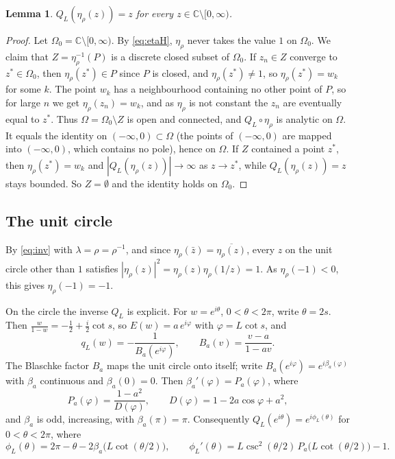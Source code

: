 \documentclass[11pt]{amsart}
\newtheorem{lemma}[theorem]{Lemma}
\theoremstyle{remark}
\newcommand{\C}{\mathbb C}
\begin{document}
\begin{lemma}\label{lem:branch}
$Q_L(\eta_\rho(z))=z$ for every $z\in\C\setminus[0,\infty)$.
\end{lemma}

\begin{proof}
Let $\Omega_0=\C\setminus[0,\infty)$. By \eqref{eq:etaH}, $\eta_\rho$ never takes the value $1$ on $\Omega_0$. We claim that $Z=\eta_\rho^{-1}(P)$ is a discrete closed subset of $\Omega_0$. If $z_n\in Z$ converge to $z^*\in\Omega_0$, then $\eta_\rho(z^*)\in P$ since $P$ is closed, and $\eta_\rho(z^*)\ne1$, so $\eta_\rho(z^*)=w_k$ for some $k$. The point $w_k$ has a neighbourhood containing no other point of $P$, so for large $n$ we get $\eta_\rho(z_n)=w_k$, and as $\eta_\rho$ is not constant the $z_n$ are eventually equal to $z^*$. Thus $\Omega=\Omega_0\setminus Z$ is open and connected, and $Q_L\circ\eta_\rho$ is analytic on $\Omega$. It equals the identity on $(-\infty,0)\subset\Omega$ (the points of $(-\infty,0)$ are mapped into $(-\infty,0)$, which contains no pole), hence on $\Omega$. If $Z$ contained a point $z^*$, then $\eta_\rho(z^*)=w_k$ and $|Q_L(\eta_\rho(z))|\to\infty$ as $z\to z^*$, while $Q_L(\eta_\rho(z))=z$ stays bounded. So $Z=\emptyset$ and the identity holds on $\Omega_0$.
\end{proof}

\subsection{The unit circle}
By \eqref{eq:inv} with $\lambda=\rho=\rho^{-1}$, and since $\eta_\rho(\bar z)=\overline{\eta_\rho(z)}$, every $z$ on the unit circle other than $1$ satisfies $|\eta_\rho(z)|^2=\eta_\rho(z)\eta_\rho(1/z)=1$. As $\eta_\rho(-1)<0$, this gives $\eta_\rho(-1)=-1$.

On the circle the inverse $Q_L$ is explicit. For $w=e^{i\theta}$, $0<\theta<2\pi$, write $\theta=2s$. Then $\frac{w}{1-w}=-\frac12+\frac i2\cot s$, so $E(w)=a\,e^{i\varphi}$ with $\varphi=L\cot s$, and
\[
q_L(w)=-\frac1{B_a(e^{i\varphi})},\qquad B_a(v)=\frac{v-a}{1-av}.
\]
The Blaschke factor $B_a$ maps the unit circle onto itself; write $B_a(e^{i\varphi})=e^{i\beta_a(\varphi)}$ with $\beta_a$ continuous and $\beta_a(0)=0$. Then $\beta_a'(\varphi)=P_a(\varphi)$, where
\[
P_a(\varphi)=\frac{1-a^2}{D(\varphi)},\qquad D(\varphi)=1-2a\cos\varphi+a^2,
\]
and $\beta_a$ is odd, increasing, with $\beta_a(\pi)=\pi$. Consequently $Q_L(e^{i\theta})=e^{i\phi_L(\theta)}$ for $0<\theta<2\pi$, where
\[
\phi_L(\theta)=2\pi-\theta-2\beta_a\bigl(L\cot(\theta/2)\bigr),\qquad \phi_L'(\theta)=L\csc^2(\theta/2)\,P_a\bigl(L\cot(\theta/2)\bigr)-1 .
\]
\end{document}
